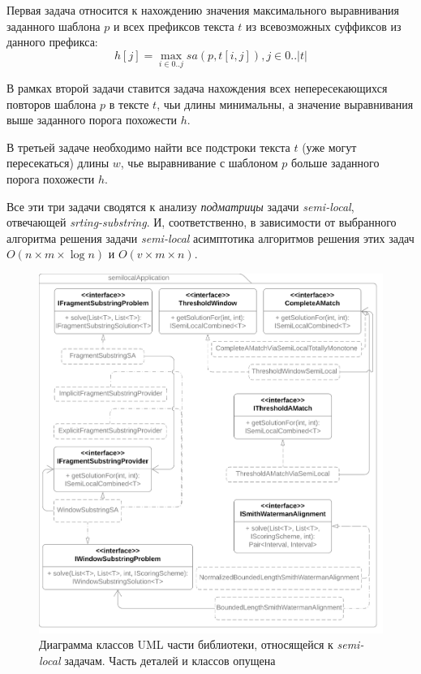 Первая задача относится к нахождению значения максимального выравнивания заданного шаблона $p$ и всех префиксов текста $t$ из всевозможных суффиксов из данного префикса:
\begin{equation}
    h[j] = \max _{i \in 0 ..j} sa(p,t[i,j]), j \in 0..|t|
\end{equation}

В рамках второй задачи ставится задача нахождения всех непересекающихся повторов шаблона $p$ в тексте $t$, чьи длины минимальны, а значение выравнивания выше заданного порога похожести $h$.

В третьей задаче необходимо найти все подстроки текста $t$ (уже могут пересекаться) длины $w$, чье выравнивание с шаблоном $p$ больше заданного порога похожести $h$.

Все эти три задачи сводятся к анализу \emph{подматрицы} задачи 
\emph{semi-local}, отвечающей \emph{srting-substring}.
И, соответственно, в зависимости от выбранного алгоритма решения задачи \emph{semi-local} асимптотика алгоритмов решения этих задач $O(n \times m \times \log n)$ и $O(v \times  m \times n)$.


\begin{figure}
    \includegraphics[width=\columnwidth]{Mishin/figures/semiLocalApplication.png}
    \caption{Диаграмма классов UML части библиотеки, относящейся к \emph{semi-local} задачам. Часть деталей и классов опущена}\label{fig:libraryApplication}
\end{figure}


